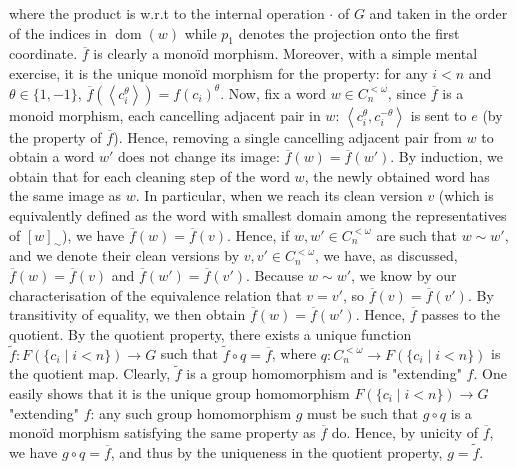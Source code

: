 \documentclass[11pt, a4paper, oneside]{article}
\theoremstyle{remark}
\theoremstyle{lemma}
\begin{document}
where the product is w.r.t to the internal operation \(\cdot\) of \(G\) and taken in the order of the indices in \(\operatorname{dom}(w)\) while \(p_1\) denotes the projection onto the first coordinate. \(\overline{f}\) is clearly a monoïd morphism. Moreover, with a simple mental exercise, it is the unique monoïd morphism for the property: for any \(i<n\) and \(\theta \in \{1,-1\}\), \(\overline{f}\!\left(\left\langle c_i^{\theta} \right\rangle\right) = f(c_i)^{\theta}\). Now, fix a word $w \in C_n^{<\omega}$, since $\overline{f}$ is a monoid morphism, each cancelling adjacent pair in $w$: $\left\langle c_i^{\theta}, c_i^{-\theta} \right\rangle$ is sent to $e$ (by the property of $\overline{f}$). Hence, removing a single cancelling adjacent pair from $w$ to obtain a word $w'$ does not change its image: $\overline{f}(w) = \overline{f}(w')$. By induction, we obtain that for each cleaning step of the word $w$, the newly obtained word has the same image as $w$. In particular, when we reach its clean version $v$ (which is equivalently defined as the word with smallest domain among the representatives of $[w]_{\sim}$), we have $\overline{f}(w) = \overline{f}(v)$. Hence, if $w, w' \in C_n^{<\omega}$ are such that $w \sim w'$, and we denote their clean versions by $v, v' \in C_n^{<\omega}$, we have, as discussed, $\overline{f}(w) = \overline{f}(v)$ and $\overline{f}(w') = \overline{f}(v')$. Because $w \sim w'$, we know by our characterisation of the equivalence relation that $v = v'$, so $\overline{f}(v) = \overline{f}(v')$. By transitivity of equality, we then obtain $\overline{f}(w) = \overline{f}(w')$. Hence, $\overline{f}$ passes to the quotient. By the quotient property, there exists a unique function \(\tilde{f} : F(\{c_i \mid i<n\}) \to G\) such that \(\tilde{f} \circ q = \overline{f}\), where $q : C_n^{<\omega} \to F(\{c_i \mid i<n\})$ is the quotient map. Clearly, $\tilde{f}$ is a group homomorphism and is "extending" $f$. One easily shows that it is the unique group homomorphism $F(\{c_i \mid i<n\}) \to G$ "extending" $f$: any such group homomorphism $g$ must be such that $g \circ q$ is a monoïd morphism satisfying the same property as $\overline{f}$ do. Hence, by unicity of $\overline{f}$, we have $g \circ q = \overline{f}$, and thus by the uniqueness in the quotient property, $g = \tilde{f}$.

 
\begin{comment}
- For an integral matrix \(E \in \bigcup_{l \in \mathbb{N}} \mathbb{Z}^{n \times l}\), we define the word in \(F(\{ c_i \mid i<n \})\) to be: 
\[
W(E) := {^{\smallfrown}_{j<l}}\,{^{\smallfrown}_{i<n}} \left[\left\langle c_i^1 \right\rangle\right]_{\sim}^{E_{i,j}}
\]
\[
= \left[\left\langle c_0^1 \right\rangle\right]_{\sim}^{E_{0,0}}\,^{\smallfrown} \cdots ^{\smallfrown} \left[\left\langle c_{n-1}^1 \right\rangle\right]_{\sim}^{E_{n-1,0}}\,^{\smallfrown} \cdots ^{\smallfrown}\left[\left\langle c_0^1 \right\rangle\right]_{\sim}^{E_{0,l-1}}\,^{\smallfrown} \cdots ^{\smallfrown} \left[\left\langle c_{n-1}^1 \right\rangle\right]_{\sim}^{E_{n-1,l-1}},
\] 
in particular, if \(l=0\), then \(W(E) = [\varepsilon]_{\sim}\).
Then we can express
\[
F(\{ c_i \mid i<n \}) = \left\{ W(E) \;\middle|\; E \in \bigcup_{l \in \mathbb{N}} \mathbb{Z}^{n \times l} \right\}.
\]
\end{comment}
\end{document}
